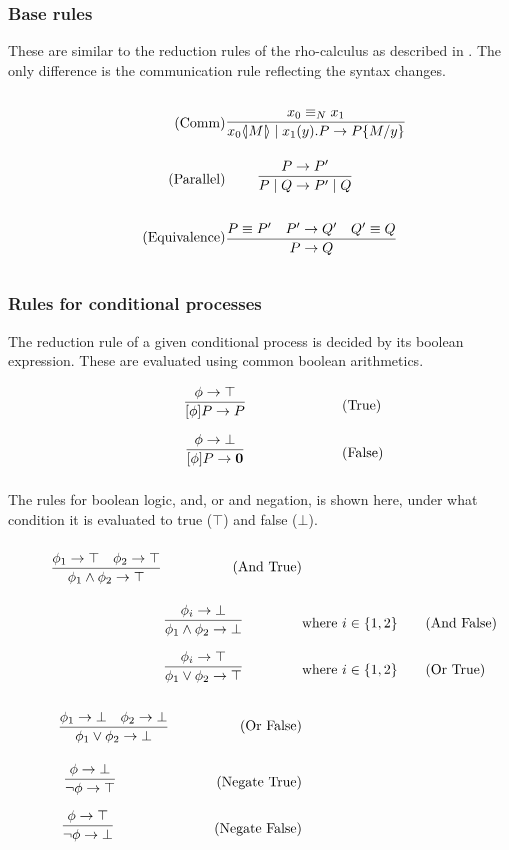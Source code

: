 \subsubsection{Base rules}
These are similar to the reduction rules of the rho-calculus as described in \citep{Meredith2005}. The only difference is the communication rule reflecting the syntax changes.

\begin{align}
    \tag{Comm} \infrule{x_0 \equiv_N x_1}{\lift{x_0}{M}\para\inp{x_1}{y}P\ra P\{M/y\}}&\\
    \tag{Parallel} \infrule{P\ra P'}{P\para Q\ra P'\para Q}&\\
    \tag{Equivalence} \infrule{P\equiv P'\quad P'\ra Q'\quad Q'\equiv Q}{P\ra Q}&
\end{align}

\FloatBarrier

\subsubsection{Rules for conditional processes}
The reduction rule of a given conditional process is decided by its boolean expression. These are evaluated using common boolean arithmetics.

\begin{align}
    & \infrule{\phi \ra \top}{[\phi]P\ra P} \tag{True}\\
    & \infrule{\phi \ra \bot}{[\phi]P\ra \nil} \tag{False}
\end{align}

The rules for boolean logic, and, or and negation, is shown here, under what condition it is evaluated to true (\ensuremath{\top}) and false (\ensuremath{\bot}).
\begin{align*}
    \infrule{\phi_1 \ra \top \quad \phi_2 \ra \top}{\phi_1 \wedge \phi_2 \ra \top}\tag{And True}\\
    \infrule{\phi_i \ra \bot}{\phi_1 \wedge \phi_2 \ra \bot} &\text{where}\ i\in \{1,2\}\tag{And False}\\
    \infrule{\phi_i \ra \top}{\phi_1 \vee \phi_2 \ra \top} &\text{where}\ i\in \{1,2\} \tag{Or True}\\
    \infrule{\phi_1 \ra \bot \quad \phi_2 \ra \bot}{\phi_1 \vee \phi_2 \ra \bot} \tag{Or False}\\
    \infrule{\phi \ra \bot}{\neg\phi \ra \top} \tag{Negate True}\\
    \infrule{\phi \ra \top}{\neg\phi \ra \bot} \tag{Negate False}\\
\end{align*}

